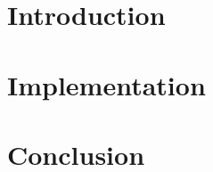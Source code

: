 
\section{Introduction}
\label{sec:introduction}

\clearpage

\section{Implementation}
\label{sec:implementation}

\clearpage

\clearpage
\section{Conclusion}
\label{sec:conclusion}


%